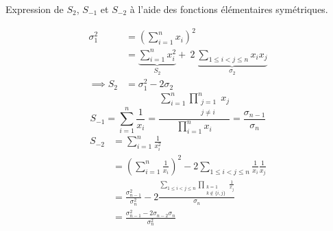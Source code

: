 \documentclass{article}
\begin{document}
\begin{question_kholle}
	[Les sommes de Newton $(S_k)_{k\in\Z^*}$ pour une famille $(x_k)_{k \in \N^*}$ sont définies par (sous réserve d'existence pour $k<0$) :
		\begin{equation}
			S_k = \sum_{i=1}^{n} x_i^k
		\end{equation}]
	{Expression de $S_2$, $S_{-1}$ et $S_{-2}$ à l'aide des fonctions élémentaires symétriques.}

	\begin{equation*}
		\begin{aligned}
			\sigma_1^2   & = \left( \sum_{i=1}^{n} x_i \right)^2                                                                                      \\
			             & = \underbrace{ \sum_{i=1}^{n} x_i^2 }_{S_2} + \ 2 \ \underbrace{ \sum_{1 \leqslant i < j \leqslant n} x_i x_j }_{\sigma_2} \\
			\implies S_2 & = \sigma_1^2 - 2 \sigma_2
		\end{aligned}
	\end{equation*}
	\begin{equation*}
		S_{-1} = \sum_{i=1}^{n} \frac{1}{x_i}
		= \frac{\displaystyle \sum_{i=1}^{n} \prod_{\substack{ j = 1 \\ j \neq i }}^{n} x_j }{\displaystyle \prod_{i=1}^{n} x_i }
		= \frac{\sigma_{n-1}}{\sigma_n}
	\end{equation*}
	\begin{equation*}
		\begin{aligned}
			S_{-2} & = \sum_{i=1}^{n} \frac{1}{x_i^2}                                                                                         \\
			       & = \left( \sum_{i=1}^{n} \frac{1}{x_i} \right)^2 - 2 \sum_{1 \leqslant i < j \leqslant n} \frac{1}{x_i} \frac{1}{x_j}     \\
			       & = \frac{\sigma_{n-1}^2}{\sigma_n^2} - 2 \frac{\displaystyle \sum_{1 \leqslant i < j \leqslant n} \prod_{\substack{ k = 1 \\ k \notin \{i,j\} }} \frac{1}{x_j} }{\sigma_n} \\
			       & = \frac{\sigma_{n-1}^2 - 2 \sigma_{n-2}\sigma_n}{\sigma_n^2}
		\end{aligned}
	\end{equation*}
\end{question_kholle}
\end{document}
